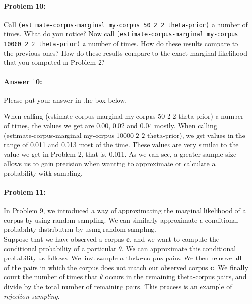 \documentclass[10pt]{article}
\newenvironment{AnswerBox}{\begin{mdframed}[style=simple]}{\end{mdframed}}
\begin{document}
\hrulefill %

\paragraph{Problem 10:}

 Call \texttt{(estimate-corpus-marginal my-corpus 50 2 2
  theta-prior)} a number of times. What do you notice? Now call
\texttt{(estimate-corpus-marginal my-corpus 10000 2 2 theta-prior)} a
number of times. How do these results compare to the previous ones?
How do these results compare to the exact marginal
likelihood that you computed in Problem 2?

\paragraph{Answer 10:} Please put your answer in the box below.

\begin{AnswerBox}%

When calling (estimate-corpus-marginal my-corpus 50 2 2 theta-prior) a number of times, the values we get are 0.00, 0.02 and 0.04 mostly. When calling (estimate-corpus-marginal my-corpus 10000 2 2 theta-prior), we get values in the range of 0.011 and 0.013 most of the time. These values are very similar to the value we get in Problem 2, that is, 0.011. As we can see, a greater sample size allows us to gain precision when wanting to approximate or calculate a probability with sampling.

    
\end{AnswerBox}%
 

\hrulefill %

\paragraph{Problem 11:}
 In Problem 9, we introduced a way of approximating the
marginal likelihood of a corpus by using random sampling. We can
similarly approximate a conditional probability distribution by using
random sampling.  \\

 Suppose that we have observed a corpus $\mathbf{c}$, and we
want to compute the conditional probability of a particular $\theta$.
We can approximate this conditional probability as follows. We first
sample $n$ theta-corpus pairs. We then remove all of the pairs in
which the corpus does not match our observed corpus $\mathbf{c}$. We
finally count the number of times that $\theta$ occurs in the
remaining theta-corpus pairs, and divide by the total number of
remaining pairs. This process is an example of \textit{rejection sampling}.
\\
\end{document}
